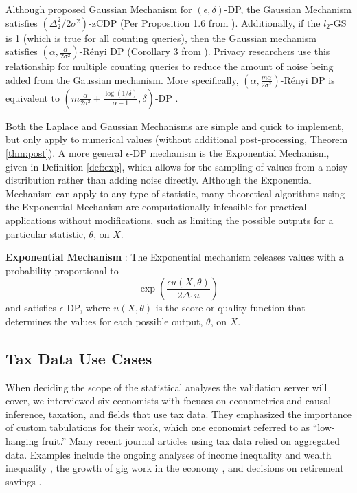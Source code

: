 Although \cite{dwork2014algorithmic} proposed Gaussian Mechanism for $(\epsilon,\delta)$-DP, the Gaussian Mechanism satisfies $(\Delta^2_2/2\sigma^2)$-zCDP (Per Proposition 1.6 from \cite{bun2016concentrated}). Additionally, if the $l_2$-GS is 1 (which is true for all counting queries), then the Gaussian mechanism satisfies $\left(\alpha, \frac{\alpha}{2\sigma^2}\right)$-R\'enyi DP (Corollary 3 from  \cite{mironov2017renyi}). Privacy researchers use this relationship for multiple counting queries to reduce the amount of noise being added from the Gaussian mechanism. More specifically, $\left(\alpha, \frac{m\alpha}{2\sigma^2}\right)$-R\'enyi DP is equivalent to $\left(m\frac{\alpha}{2\sigma^2}+\frac{\log(1/\delta)}{\alpha-1}, \delta\right)$-DP \autocite{mironov2017renyi,wang2019subsampled}.

Both the Laplace and Gaussian Mechanisms are simple and quick to implement, but only apply to numerical values (without additional post-processing, Theorem \ref{thm:post}). A more general $\epsilon$-DP mechanism is the Exponential Mechanism, given in Definition \ref{def:exp}, which allows for the sampling of values from a noisy distribution rather than adding noise directly. Although the Exponential Mechanism can apply to any type of statistic, many theoretical algorithms using the Exponential Mechanism are computationally infeasible for practical applications without modifications, such as limiting the possible outputs for a particular statistic, $\theta$, on $X$.

\begin{defn}\label{def:exp} \textbf{Exponential Mechanism} \autocite{mcsherry2007mechanism}:
    The Exponential mechanism releases values with a probability proportional to
        \begin{equation}\label{eqn:exp}
            \exp \left(\frac{\epsilon u(X, \theta)}{2\Delta_1 u}\right)
        \end{equation}
    and satisfies $\epsilon$-DP, where $u(X,\theta)$ is the score or quality function that determines the values for each possible output, $\theta$, on $X$.
\end{defn}

\subsection{Tax Data Use Cases}\label{subsec:data}
When deciding the scope of the statistical analyses the validation server will cover, we interviewed six economists with focuses on econometrics and causal inference, taxation, and fields that use tax data. They emphasized the importance of custom tabulations for their work, which one economist referred to as ``low-hanging fruit.'' Many recent journal articles using tax data relied on aggregated data. Examples include the ongoing analyses of income inequality \autocite{auten2018income} and wealth inequality \autocite{smith2019top}, the growth of gig work in the economy \autocite{collins2019gig}, and decisions on retirement savings \autocite{brady2020reconciling}.

